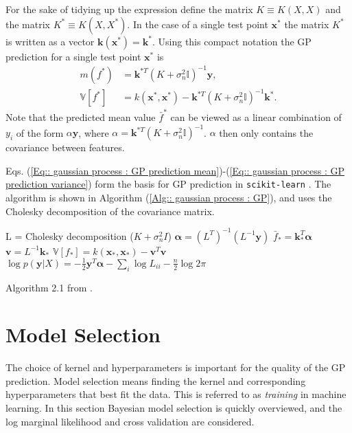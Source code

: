 \documentclass[twoside,english]{uiofysmaster}
\begin{document}
For the sake of tidying up the expression define the matrix $K \equiv K(X, X)$ and the matrix $K^* \equiv K(X, X^*)$. In the case of a single test point $\textbf{x}^*$ the matrix $K^*$ is written as a vector $\textbf{k}(\textbf{x}^*) = \textbf{k}^*$. Using this compact notation the GP prediction for a single test point $\textbf{x}^*$ is
\begin{align}
m(f^*) &= \textbf{k}^{*T}(K + \sigma_n^2\mathbb{I})^{-1} \textbf{y},\label{Eq:: gaussian process : GP prediction mean}\\
\mathbb{V}[f^*] &= k(\textbf{x}^*, \textbf{x}^*) - \textbf{k}^{*T}(K + \sigma_n^2 \mathbb{I})^{-1} \textbf{k}^*\label{Eq:: gaussian process : GP prediction variance}.
\end{align}
Note that the predicted mean value $\bar{f}^*$ can be viewed as a linear combination of $y_i$ of the form $\alpha \textbf{y}$, where $\alpha = \textbf{k}^{*T}(K + \sigma_n^2\mathbb{I})^{-1}$. $\alpha$ then only contains the covariance between features.

Eqs. (\ref{Eq:: gaussian process : GP prediction mean})-(\ref{Eq:: gaussian process : GP prediction variance}) form the basis for GP prediction in \verb|scikit-learn|  \cite{scikit-learn}. The algorithm is shown in Algorithm (\ref{Alg:: gaussian process : GP}), and uses the Cholesky decomposition of the covariance matrix.

\begin{algorithm}
L = Cholesky decomposition ($K + \sigma_n^2 I$) \;
$\boldsymbol{\alpha} = (L^T)^{-1}(L^{-1} \textbf{y})$ \;
$\bar{f}_* = \textbf{k}_*^T \boldsymbol{\alpha}$ \;
$\textbf{v} = L^{-1} \textbf{k}_*$ \;
$\mathbb{V}[f_*] = k(\textbf{x}_*, \textbf{x}_*) - \textbf{v}^T \textbf{v}$ \;
$\log p(\textbf{y}|X) = - \frac{1}{2} \textbf{y}^T \boldsymbol{\alpha} - \sum_i \log L_{ii} - \frac{n}{2} \log 2 \pi$ \;
\caption{Algorithm 2.1 from \cite{rasmussen2006gaussian}.}
\label{Alg:: gaussian process : GP}
\end{algorithm}




\section{Model Selection}

The choice of kernel and hyperparameters is important for the quality of the GP prediction. Model selection means finding the  kernel and corresponding hyperparameters that best fit the data. This is referred to as \textit{training} in machine learning. In this section Bayesian model selection is quickly overviewed, and the log marginal likelihood and cross validation are considered.
\end{document}

